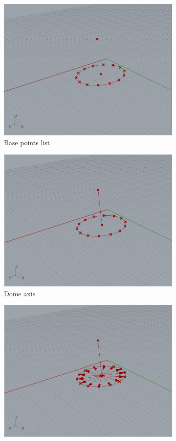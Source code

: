 \documentclass[preprint,12pt,3p]{elsarticle}
\begin{document}
\begin{figure}
\begin{subfigure}{0.3\textwidth}
  \centering
  \includegraphics[width=.9\linewidth]{a02s04.png}
  \caption{Base points list}
  \label{fig:a02s04}
\end{subfigure}
\begin{subfigure}{0.3\textwidth}
  \centering
  \includegraphics[width=.9\linewidth]{a02s05.png}
  \caption{Dome axis}
  \label{fig:a02s05}
\end{subfigure}
\begin{subfigure}{0.3\textwidth}
  \centering
  \includegraphics[width=.9\linewidth]{a02s06.png}

\end{subfigure}
\end{figure}
\end{document}
